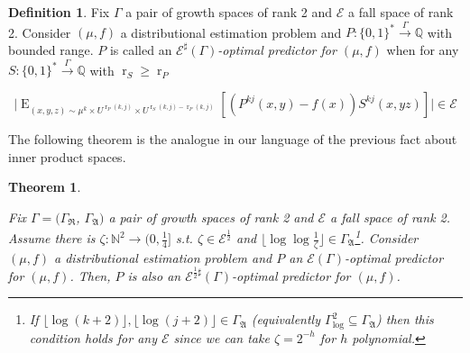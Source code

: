 \documentclass{article}
\numberwithin{equation}{section}
\theoremstyle{definition}
\newtheorem{definition}{Definition}[section]
\theoremstyle{plain}
\newtheorem{theorem}{Theorem}[section]
\newcommand{\Words}{{\{ 0, 1 \}^*}}
\DeclareMathOperator{\E}{E}
\DeclareMathOperator{\R}{r}
\newcommand{\Nats}{\mathbb{N}}
\newcommand{\Rats}{\mathbb{Q}}
\newcommand{\Abs}[1]{\lvert #1 \rvert}
\newcommand{\Floor}[1]{\lfloor #1 \rfloor}
\begin{document}
\begin {definition}

Fix $\Gamma$ a pair of growth spaces of rank 2 and $\mathcal{E}$ a fall space of rank 2. Consider $(\mu,f)$ a distributional estimation problem and $P: \Words \xrightarrow{\Gamma} \Rats$ with bounded range. $P$ is called an \emph{$\mathcal{E}^\sharp(\Gamma)$-optimal predictor for $(\mu,f)$} when for any $S: \Words \xrightarrow{\Gamma} \Rats$ with $\R_S \geq \R_P$

\begin{equation}
\label{eqn:op_sharp}
\Abs{\E_{(x,y,z) \sim \mu^k \times U^{\R_P(k,j)} \times U^{\R_S(k,j)-\R_P(k,j)}}[(P^{kj}(x,y) - f(x))S^{kj}(x,yz)]} \in \mathcal{E}
\end{equation}

\end {definition}

The following theorem is the analogue in our language of the previous fact about inner product spaces.

\begin{theorem}
\label{thm:ort}

Fix $\Gamma=(\Gamma_{\mathfrak{R}}$, $\Gamma_{\mathfrak{A}})$ a pair of growth spaces of rank 2 and $\mathcal{E}$ a fall space of rank 2. Assume there is $\zeta: \Nats^2 \rightarrow (0,\frac{1}{4}]$ s.t. $\zeta \in \mathcal{E}^{\frac{1}{2}}$ and ${\Floor{\log \log \frac{1}{\zeta}} \in \Gamma_{\mathfrak{A}}}$\footnote{If $\Floor{\log(k+2)}, \Floor{\log(j+2)} \in \Gamma_{\mathfrak{A}}$ (equivalently $\Gamma_{\text{log}}^2 \subseteq \Gamma_{\mathfrak{A}}$) then this condition holds for any $\mathcal{E}$ since we can take $\zeta = 2^{-h}$ for $h$ polynomial.}. Consider $(\mu,f)$ a distributional estimation problem and $P$ an $\mathcal{E}(\Gamma)$-optimal predictor for $(\mu,f)$. Then, $P$ is also an $\mathcal{E}^{\frac{1}{2}\sharp}(\Gamma)$-optimal predictor for $(\mu,f)$.

\end{theorem}
\end{document}
